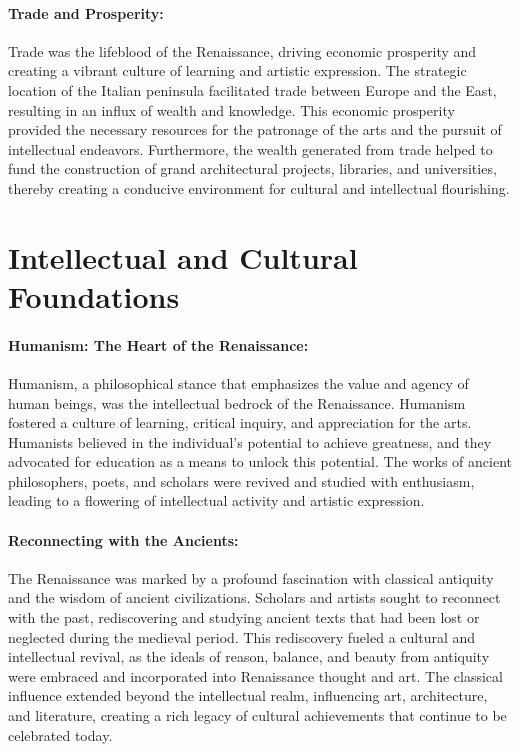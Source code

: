 \documentclass{book}
\begin{document}
\paragraph{Trade and Prosperity:}
Trade was the lifeblood of the Renaissance, driving economic prosperity and creating a vibrant culture of learning and artistic expression. The strategic location of the Italian peninsula facilitated trade between Europe and the East, resulting in an influx of wealth and knowledge. This economic prosperity provided the necessary resources for the patronage of the arts and the pursuit of intellectual endeavors. Furthermore, the wealth generated from trade helped to fund the construction of grand architectural projects, libraries, and universities, thereby creating a conducive environment for cultural and intellectual flourishing.

\section*{Intellectual and Cultural Foundations}

\paragraph{Humanism: The Heart of the Renaissance:}
Humanism, a philosophical stance that emphasizes the value and agency of human beings, was the intellectual bedrock of the Renaissance. Humanism fostered a culture of learning, critical inquiry, and appreciation for the arts. Humanists believed in the individual's potential to achieve greatness, and they advocated for education as a means to unlock this potential. The works of ancient philosophers, poets, and scholars were revived and studied with enthusiasm, leading to a flowering of intellectual activity and artistic expression.

\paragraph{Reconnecting with the Ancients:}
The Renaissance was marked by a profound fascination with classical antiquity and the wisdom of ancient civilizations. Scholars and artists sought to reconnect with the past, rediscovering and studying ancient texts that had been lost or neglected during the medieval period. This rediscovery fueled a cultural and intellectual revival, as the ideals of reason, balance, and beauty from antiquity were embraced and incorporated into Renaissance thought and art. The classical influence extended beyond the intellectual realm, influencing art, architecture, and literature, creating a rich legacy of cultural achievements that continue to be celebrated today.
\end{document}
